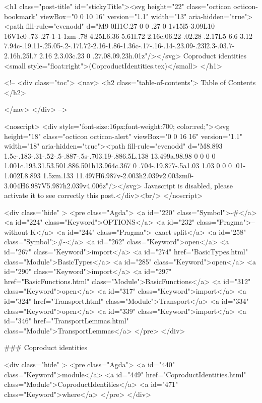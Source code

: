   <h1 class="post-title" id="stickyTitle"><svg height="22" class="octicon octicon-bookmark" viewBox="0 0 10 16" version="1.1" width="13" aria-hidden="true"><path fill-rule="evenodd" d="M9 0H1C.27 0 0 .27 0 1v15l5-3.09L10 16V1c0-.73-.27-1-1-1zm-.78 4.25L6.36 5.61l.72 2.16c.06.22-.02.28-.2.17L5 6.6 3.12 7.94c-.19.11-.25.05-.2-.17l.72-2.16-1.86-1.36c-.17-.16-.14-.23.09-.23l2.3-.03.7-2.16h.25l.7 2.16 2.3.03c.23 0 .27.08.09.23h.01z"/></svg> Coproduct identities <small style="float:right">(CoproductIdentities.tex)</small>
  </h1>

  <!-- 
  <div class="toc">
    <nav>
    <h2 class="table-of-contents"> Table of Contents </h2>
      

    </nav>
  </div>
   -->

  <noscript>
  <div style="font-size:16px;font-weight:700; color:red;"><svg height="18" class="octicon octicon-alert" viewBox="0 0 16 16" version="1.1" width="18" aria-hidden="true"><path fill-rule="evenodd" d="M8.893 1.5c-.183-.31-.52-.5-.887-.5s-.703.19-.886.5L.138 13.499a.98.98 0 0 0 0 1.001c.193.31.53.501.886.501h13.964c.367 0 .704-.19.877-.5a1.03 1.03 0 0 0 .01-1.002L8.893 1.5zm.133 11.497H6.987v-2.003h2.039v2.003zm0-3.004H6.987V5.987h2.039v4.006z"/></svg> Javascript is disabled, please activate it to see correctly this post.</div><br/>
  </noscript>

  <div class="hide" >
<pre class="Agda">
<a id="220" class="Symbol">{-#</a> <a id="224" class="Keyword">OPTIONS</a> <a id="232" class="Pragma">--without-K</a> <a id="244" class="Pragma">--exact-split</a> <a id="258" class="Symbol">#-}</a>
<a id="262" class="Keyword">open</a> <a id="267" class="Keyword">import</a> <a id="274" href="BasicTypes.html" class="Module">BasicTypes</a>
<a id="285" class="Keyword">open</a> <a id="290" class="Keyword">import</a> <a id="297" href="BasicFunctions.html" class="Module">BasicFunctions</a>
<a id="312" class="Keyword">open</a> <a id="317" class="Keyword">import</a> <a id="324" href="Transport.html" class="Module">Transport</a>
<a id="334" class="Keyword">open</a> <a id="339" class="Keyword">import</a> <a id="346" href="TransportLemmas.html" class="Module">TransportLemmas</a>
</pre>
</div>

### Coproduct identities

<div class="hide" >
<pre class="Agda">
<a id="440" class="Keyword">module</a>
  <a id="449" href="CoproductIdentities.html" class="Module">CoproductIdentities</a>
  <a id="471" class="Keyword">where</a>
</pre>
</div>

